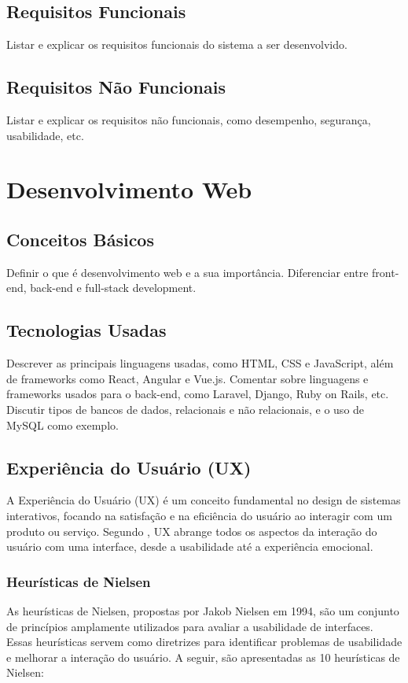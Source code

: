 \subsection{Requisitos Funcionais}
Listar e explicar os requisitos funcionais do sistema a ser desenvolvido.

\subsection{Requisitos Não Funcionais}
Listar e explicar os requisitos não funcionais, como desempenho, segurança, usabilidade, etc.

\section{Desenvolvimento Web}
\subsection{Conceitos Básicos}
Definir o que é desenvolvimento web e a sua importância. Diferenciar entre front-end, back-end e full-stack development.

\subsection{Tecnologias Usadas}
Descrever as principais linguagens usadas, como HTML, CSS e JavaScript, além de frameworks como React, Angular e Vue.js. Comentar sobre linguagens e frameworks usados para o back-end, como Laravel, Django, Ruby on Rails, etc. Discutir tipos de bancos de dados, relacionais e não relacionais, e o uso de MySQL como exemplo.

\subsection{Experiência do Usuário (UX)}
A Experiência do Usuário (UX) é um conceito fundamental no design de sistemas interativos, focando na satisfação e na eficiência do usuário ao interagir com um produto ou serviço. Segundo \cite{Norman}, UX abrange todos os aspectos da interação do usuário com uma interface, desde a usabilidade até a experiência emocional.

\subsubsection{Heurísticas de Nielsen}
As heurísticas de Nielsen, propostas por Jakob Nielsen em 1994, são um conjunto de princípios amplamente utilizados para avaliar a usabilidade de interfaces. Essas heurísticas servem como diretrizes para identificar problemas de usabilidade e melhorar a interação do usuário. A seguir, são apresentadas as 10 heurísticas de Nielsen:

